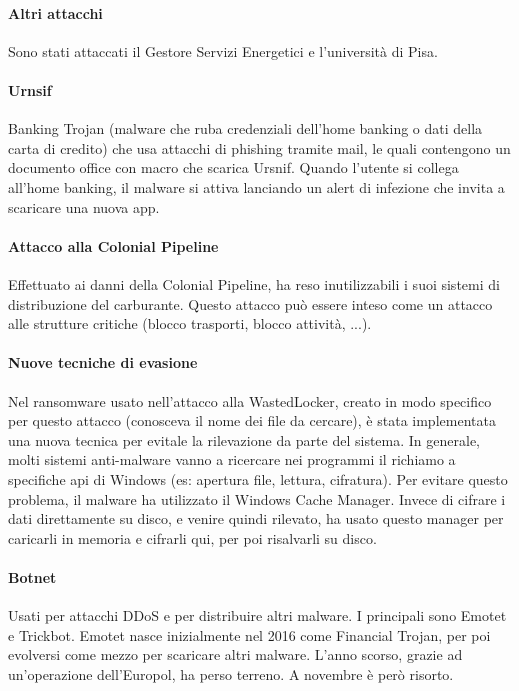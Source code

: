 \paragraph{Altri attacchi} Sono stati attaccati il Gestore Servizi Energetici e l'università di Pisa.

\paragraph{Urnsif} Banking Trojan (malware che ruba credenziali dell'home banking o dati della carta di credito) che usa attacchi di phishing tramite mail, le quali contengono un documento office con macro che scarica Ursnif. Quando l'utente si collega all'home banking, il malware si attiva lanciando un alert di infezione che invita a scaricare una nuova app.

\paragraph{Attacco alla Colonial Pipeline} Effettuato ai danni della Colonial Pipeline, ha reso inutilizzabili i suoi sistemi di distribuzione del carburante. Questo attacco può essere inteso come un attacco alle strutture critiche (blocco trasporti, blocco attività, ...).

\paragraph{Nuove tecniche di evasione} Nel ransomware usato nell'attacco alla WastedLocker, creato in modo specifico per questo attacco (conosceva il nome dei file da cercare), è stata implementata una nuova tecnica per evitale la rilevazione da parte del sistema. In generale, molti sistemi anti-malware vanno a ricercare nei programmi il richiamo a specifiche api di Windows (es: apertura file, lettura, cifratura). Per evitare questo problema, il malware ha utilizzato il Windows Cache Manager. Invece di cifrare i dati direttamente su disco, e venire quindi rilevato, ha usato questo manager per caricarli in memoria e cifrarli qui, per poi risalvarli su disco.

\paragraph{Botnet} Usati per attacchi DDoS e per distribuire altri malware. I principali sono Emotet e Trickbot. Emotet nasce inizialmente nel 2016 come Financial Trojan, per poi evolversi come mezzo per scaricare altri malware. L'anno scorso, grazie ad un'operazione dell'Europol, ha perso terreno. A novembre è però risorto.

